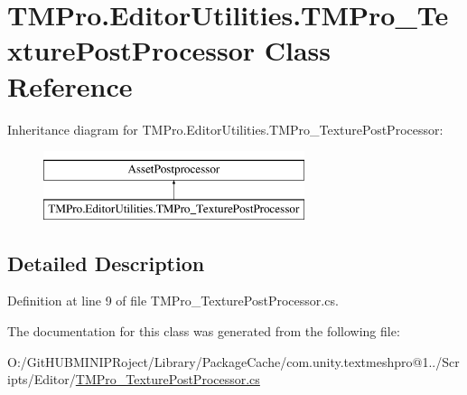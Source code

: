 \hypertarget{class_t_m_pro_1_1_editor_utilities_1_1_t_m_pro___texture_post_processor}{}\section{T\+M\+Pro.\+Editor\+Utilities.\+T\+M\+Pro\+\_\+\+Texture\+Post\+Processor Class Reference}
\label{class_t_m_pro_1_1_editor_utilities_1_1_t_m_pro___texture_post_processor}
Inheritance diagram for T\+M\+Pro.\+Editor\+Utilities.\+T\+M\+Pro\+\_\+\+Texture\+Post\+Processor\+:\begin{figure}[H]
\begin{center}
\leavevmode
\includegraphics[height=2.000000cm]{class_t_m_pro_1_1_editor_utilities_1_1_t_m_pro___texture_post_processor}
\end{center}
\end{figure}


\subsection{Detailed Description}


Definition at line 9 of file T\+M\+Pro\+\_\+\+Texture\+Post\+Processor.\+cs.



The documentation for this class was generated from the following file\+:\begin{DoxyCompactItemize}
\item 
O\+:/\+Git\+H\+U\+B\+M\+I\+N\+I\+P\+Roject/\+Library/\+Package\+Cache/com.\+unity.\+textmeshpro@1../\+Scripts/\+Editor/\mbox{\hyperlink{_t_m_pro___texture_post_processor_8cs}{T\+M\+Pro\+\_\+\+Texture\+Post\+Processor.\+cs}}\end{DoxyCompactItemize}
